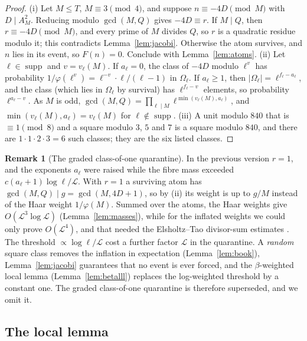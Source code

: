 \documentclass[11pt,reqno]{amsart}
\theoremstyle{definition}
\newtheorem{remark}[theorem]{Remark}
\newcommand{\Lc}{\mathcal L}
\newcommand{\supp}{\operatorname{supp}}
\begin{document}
\begin{proof}
(i) Let $M\le T$, $M\equiv3\pmod4$, and suppose $n\equiv-4D\pmod M$ with
$D\mid A_M^2$.  Reducing modulo $\gcd(M,Q)$ gives $-4D\equiv r$.  If $M\mid Q$,
then $r\equiv-4D\pmod M$, and every prime of $M$ divides $Q$, so $r$ is a
quadratic residue modulo it; this contradicts Lemma~\ref{lem:jacobi}.
Otherwise the atom survives, and $n$ lies in its event, so $F(n)=0$.
Conclude with Lemma~\ref{lem:atoms}.
(ii) Let $\ell\in\supp$ and $v=v_\ell(M)$.  If $a_\ell=0$, the class of $-4D$
modulo $\ell^v$ has probability $1/\varphi(\ell^v)=\ell^{-v}\cdot\ell/(\ell-1)$ in
$\Omega_\ell$.  If $a_\ell\ge1$, then $|\Omega_\ell|=\ell^{f_\ell-a_\ell}$, and the class
(which lies in $\Omega_\ell$ by survival) has $\ell^{f_\ell-v}$ elements, so
probability $\ell^{a_\ell-v}$.  As $M$ is odd,
$\gcd(M,Q)=\prod_{\ell\mid M}\ell^{\min(v_\ell(M),a_\ell)}$, and
$\min(v_\ell(M),a_\ell)=v_\ell(M)$ for $\ell\notin\supp$.
(iii) A unit modulo $840$ that is $\equiv1\pmod8$ and a square modulo $3$, $5$
and $7$ is a square modulo $840$, and there are $1\cdot1\cdot2\cdot3=6$ such
classes; they are the six listed classes.
\end{proof}

\begin{remark}[The graded class-of-one quarantine]\label{rem:graded}
In the previous version $r=1$, and the exponents $a_\ell$ were raised while
the fibre mass exceeded $c(a_\ell+1)\log\ell/\Lc$.  With $r=1$ a surviving atom
has $\gcd(M,Q)\mid g=\gcd(M,4D+1)$, so by (ii) its weight is up to $g/M$
instead of the Haar weight $1/\varphi(M)$.  Summed over the atoms, the Haar
weights give $O(\Lc^3\log\Lc)$ (Lemma~\ref{lem:masses}), while for the
inflated weights we could only prove $O(\Lc^4)$, and that needed the
Elsholtz--Tao divisor-sum estimates \cite{ET}.  The
threshold $\propto\log\ell/\Lc$ cost a further factor $\Lc$ in the
quarantine.  A \emph{random} square class removes the inflation in
expectation (Lemma~\ref{lem:book}), Lemma~\ref{lem:jacobi} guarantees that
no event is ever forced, and the $\beta$-weighted local lemma
(Lemma~\ref{lem:betalll}) replaces the log-weighted threshold by a constant
one.  The graded class-of-one quarantine is therefore superseded, and we
omit it.
\end{remark}

\subsection*{The local lemma}
\end{document}
